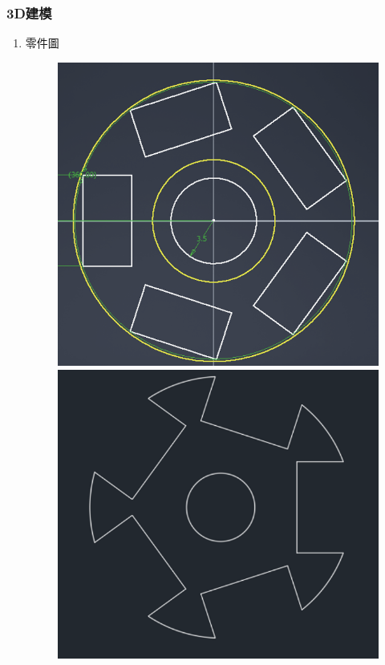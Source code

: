 \documentclass[12pt,a4paper]{article}
\begin{document}
\begin{CJK*}{UTF8}{bkai}
    \subsubsection{3D建模}
    \begin{enumerate}
        \item 零件圖
              \begin{figure}[h]
                  \centering
                  \includegraphics[height=0.2\textheight]{./images/cookie_draft.png}
                  \includegraphics[height=0.2\textheight]{./images/filling_draft.png}

\end{figure}
\end{enumerate}
\end{CJK*}
\end{document}
